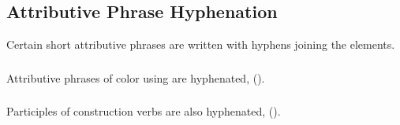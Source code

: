 \subsection{Attributive Phrase Hyphenation} Certain short attributive
phrases are written with hy\-phens joining the elements.

\subsubsection{} Attributive phrases of color using  
are hyphenated,   ().

\subsubsection{} Participles of  construction verbs are also
hyphenated,  
().

